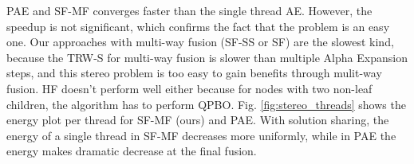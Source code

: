PAE and SF-MF converges faster than the single thread AE. However, the
speedup is not significant, which confirms the fact that the problem
is an easy one.
Our approaches with multi-way fusion (SF-SS or SF) are the slowest
kind, because the TRW-S for multi-way fusion is slower than multiple
Alpha Expansion steps, and this stereo problem is too easy to gain
benefits through mulit-way fusion. HF doesn't perform well either
because for nodes with two non-leaf children, the algorithm has to
perform QPBO.
%
%
%
%
Fig. \ref{fig:stereo_threads} shows the energy plot per thread for
SF-MF (ours) and PAE. With solution sharing, the energy of a single
thread in SF-MF decreases more uniformly, while in PAE the energy
makes dramatic decrease at the final fusion.
%

